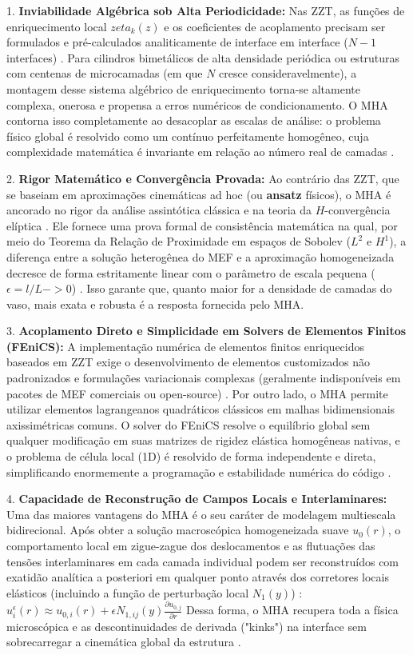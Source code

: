 1. \textbf{Inviabilidade Algébrica sob Alta Periodicidade:} Nas ZZT, as funções de enriquecimento local $zeta_k (z)$ e os coeficientes de acoplamento precisam ser formulados e pré-calculados analiticamente de interface em interface ($N-1$ interfaces) \cite{bakhvalov1989}. Para cilindros bimetálicos de alta densidade periódica ou estruturas com centenas de microcamadas (em que $N$ cresce consideravelmente), a montagem desse sistema algébrico de enriquecimento torna-se altamente complexa, onerosa e propensa a erros numéricos de condicionamento. O MHA contorna isso completamente ao desacoplar as escalas de análise: o problema físico global é resolvido como um contínuo perfeitamente homogêneo, cuja complexidade matemática é invariante em relação ao número real de camadas \cite{bakhvalov1989}.

2. \textbf{Rigor Matemático e Convergência Provada:} Ao contrário das ZZT, que se baseiam em aproximações cinemáticas ad hoc (ou \textbf{ansatz} físicos), o MHA é ancorado no rigor da análise assintótica clássica e na teoria da $H$-convergência elíptica \cite{bakhvalov1989}. Ele fornece uma prova formal de consistência matemática na qual, por meio do Teorema da Relação de Proximidade em espaços de Sobolev ($L^2$ e $H^1$), a diferença entre a solução heterogênea do MEF e a aproximação homogeneizada decresce de forma estritamente linear com o parâmetro de escala pequena ($\epsilon = l/L -> 0$) \cite{bakhvalov1989}. Isso garante que, quanto maior for a densidade de camadas do vaso, mais exata e robusta é a resposta fornecida pelo MHA.

3. \textbf{Acoplamento Direto e Simplicidade em Solvers de Elementos Finitos (FEniCS):} A implementação numérica de elementos finitos enriquecidos baseados em ZZT exige o desenvolvimento de elementos customizados não padronizados e formulações variacionais complexas (geralmente indisponíveis em pacotes de MEF comerciais ou open-source) \cite{logg2012automated}. Por outro lado, o MHA permite utilizar elementos lagrangeanos quadráticos clássicos em malhas bidimensionais axissimétricas comuns. O solver do FEniCS resolve o equilíbrio global sem qualquer modificação em suas matrizes de rigidez elástica homogêneas nativas, e o problema de célula local (1D) é resolvido de forma independente e direta, simplificando enormemente a programação e estabilidade numérica do código \cite{logg2012automated}.

4. \textbf{Capacidade de Reconstrução de Campos Locais e Interlaminares:} Uma das maiores vantagens do MHA é o seu caráter de modelagem multiescala bidirecional. Após obter a solução macroscópica homogeneizada suave $u_0(r)$, o comportamento local em zigue-zague dos deslocamentos e as flutuações das tensões interlaminares em cada camada individual podem ser reconstruídos com exatidão analítica a posteriori em qualquer ponto através dos corretores locais elásticos (incluindo a função de perturbação local $N_1(y)$) \cite{bakhvalov1989}:
  $ u_i^\epsilon(r) \approx u_{0,i}(r) + \epsilon N_{1,ij}(y) \frac{\partial u_{0,j}}{\partial r} $ \label{eq:correction_mha}
  Dessa forma, o MHA recupera toda a física microscópica e as descontinuidades de derivada ("kinks") na interface sem sobrecarregar a cinemática global da estrutura \cite{bakhvalov1989}.


